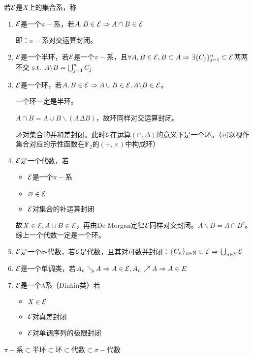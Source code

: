 \documentclass{ctexbook}
\begin{document}
\begin{Def}
  若$\mathcal{E}$是$X$上的集合系，称
  \begin{enumerate}
  \item $\mathcal{E}$是一个$\pi-$系，若$A,B\in \mathcal{E}\Rightarrow A\cap B\in\mathcal{E}$

    即：$\pi-$系对交运算封闭。
  
  \item $\mathcal{E}$是一个半环，若$\mathcal{E}$是一个$\pi-$系，且$\forall A,B\in \mathcal{E}, B\subset A\Rightarrow \exists \{C_{j}\}_{j=1}^{n}\subset \mathcal{E}$两两不交$\text{ s.t. } A\backslash B=\bigcup_{j=1}^{n}C_{j}$
   
  \item $\mathcal{E}$是一个环，若$A,B\in\mathcal{E}\Rightarrow A\cup B\in \mathcal{E},A\backslash B\in \mathcal{E}$。

    一个环一定是半环。

    $A\cap B=A\cup B\backslash (A\Delta B)$，故环同样对交运算封闭。

    环对集合的并和差封闭。此时$\mathcal{E}$在运算$(\cap,\Delta)$的意义下是一个环。（可以视作集合对应的示性函数在$\mathbf{F}_{2}$的$(+,\times)$中构成环）
  \item $\mathcal{E}$是一个代数，若
    \begin{itemize}
    \item $\mathcal{E}$是一个$\pi-$系
    \item $\varnothing\in\mathcal{E}$
      
    \item $\mathcal{E}$对集合的补运算封闭
    \end{itemize}
    故$X\in\mathcal{E},A\cup B\in \mathcal{E}$，再由De Morgan定律$\mathcal{E}$同样对交封闭。$A\backslash B=A\cap B^{c}$。综上一个代数一定是一个环。
    
  \item $\mathcal{E}$是一个$\sigma$-代数，若$\mathcal{E}$是代数，且其对可数并封闭：$\{C_{n}\}_{n\in\mathbb{N}}\subset \mathcal{E}\Rightarrow\bigcup_{n\in\mathbb{N}}\mathcal{E}$
  \item $\mathcal{E}$是一个单调类，若$A_{n}\searrow A\Rightarrow A\in \mathcal{E},A_{n}\nearrow A\Rightarrow A\in E$
  \item $\mathcal{E}$是一个$\lambda$系（Dinkin类）若
    \begin{itemize}
    \item $X\in\mathcal{E}$
     
    \item $\mathcal{E}$对真差封闭
      
    \item $\mathcal{E}$对单调序列的极限封闭
    \end{itemize}
  \end{enumerate}
\end{Def}
$\pi-$系$\subset$半环$\subset$环$\subset $代数$\subset \sigma-$代数
\end{document}
